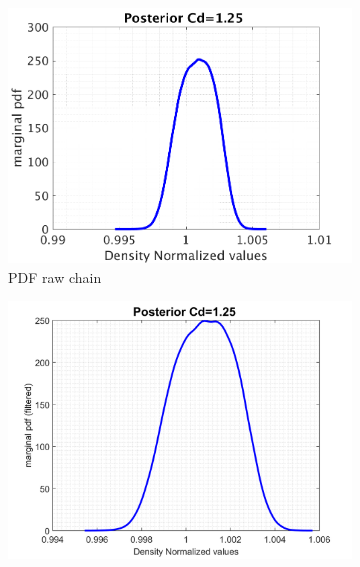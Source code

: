 \documentclass{article}
\begin{document}
\begin{figure}[H]
\captionsetup[subfigure]{justification=centering}
\begin{center}
  \begin{subfigure}{0.4\textwidth}
    \centering\includegraphics[width=1.1\textwidth,keepaspectratio]{images/inverse_problem/infer_radius/drag_125/range_short/densityraw_PDF.png}
    \caption{\centering PDF raw chain}
  \end{subfigure}
 \begin{subfigure}{0.4\textwidth}
    \centering\includegraphics[width=1.1\textwidth,keepaspectratio]{images/inverse_problem/infer_radius/drag_125/range_short/densityfiltered_PDF.png}

\end{subfigure}
\end{center}
\end{figure}
\end{document}
